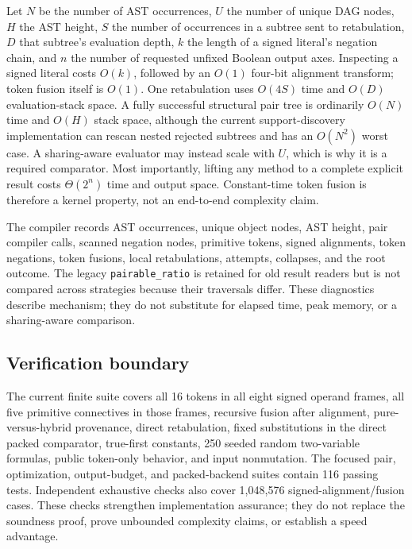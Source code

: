 \documentclass[11pt]{article}
\begin{document}
Let $N$ be the number of AST occurrences, $U$ the number of unique DAG nodes,
$H$ the AST height, $S$ the number of occurrences in a subtree sent to
retabulation, $D$ that subtree's evaluation depth, $k$ the length of a signed
literal's negation chain, and $n$ the number of requested unfixed Boolean
output axes. Inspecting a signed literal costs $O(k)$, followed by an $O(1)$
four-bit alignment transform; token fusion itself is $O(1)$. One retabulation
uses $O(4S)$ time and $O(D)$ evaluation-stack space. A fully successful
structural pair tree is ordinarily $O(N)$ time and $O(H)$ stack space, although
the current support-discovery implementation can rescan nested rejected
subtrees and has an $O(N^2)$ worst case. A sharing-aware evaluator may instead
scale with $U$, which is why it is a required comparator. Most importantly,
lifting any method to a complete explicit result costs $\Theta(2^n)$ time and
output space.
Constant-time token fusion is therefore a kernel property, not an end-to-end
complexity claim.

The compiler records AST occurrences, unique object nodes, AST height, pair
compiler calls, scanned negation nodes, primitive tokens, signed alignments,
token negations, token fusions, local retabulations, attempts, collapses, and
the root outcome. The legacy \texttt{pairable\_ratio} is retained for old
result readers but is not compared across strategies because their traversals
differ. These diagnostics describe mechanism; they do not substitute for
elapsed time, peak memory, or a sharing-aware comparison.

\subsection{Verification boundary}

The current finite suite covers all 16 tokens in all eight signed operand
frames, all five primitive connectives in those frames, recursive fusion after
alignment, pure-versus-hybrid provenance, direct retabulation, fixed
substitutions in the direct packed comparator, true-first constants, 250 seeded
random two-variable formulas, public token-only behavior, and input
nonmutation. The focused pair, optimization, output-budget, and packed-backend
suites contain 116 passing tests.
Independent exhaustive checks also cover 1,048,576 signed-alignment/fusion
cases. These checks strengthen implementation assurance; they do not replace
the soundness proof, prove unbounded complexity claims, or establish a speed
advantage.
\end{document}
